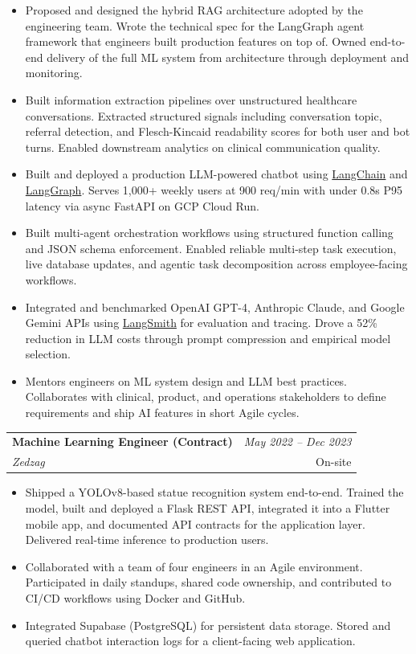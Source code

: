 \documentclass[a4paper,11pt]{article}
\makeatletter
\newcommand{\resumeSubheading}[4]{
\vspace{0.5mm}\item
    \begin{tabular*}{0.98\textwidth}[t]{l@{\extracolsep{\fill}}r}
        \textbf{#1} & \textit{\footnotesize{#4}} \\
        \textit{\footnotesize{#3}} &  \footnotesize{#2}\\
    \end{tabular*}
    \vspace{-2.4mm}
}
\newcommand{\resumeItemListStart}{\begin{justify}\begin{itemize}[leftmargin=3ex, rightmargin=2ex, noitemsep,labelsep=1.2mm,itemsep=0mm]\small}
\newcommand{\resumeItemListEnd}{\end{itemize}\end{justify}\vspace{-2mm}}
\makeatother
\begin{document}
\resumeItemListStart
\item Proposed and designed the hybrid RAG architecture adopted by the engineering team. Wrote the technical spec for the LangGraph agent framework that engineers built production features on top of. Owned end-to-end delivery of the full ML system from architecture through deployment and monitoring.
\item Built information extraction pipelines over unstructured healthcare conversations. Extracted structured signals including conversation topic, referral detection, and Flesch-Kincaid readability scores for both user and bot turns. Enabled downstream analytics on clinical communication quality.
\item Built and deployed a production LLM-powered chatbot using \href{https://www.langchain.com/}{LangChain} and \href{https://langchain-ai.github.io/langgraph/}{LangGraph}. Serves 1,000+ weekly users at 900 req/min with under 0.8s P95 latency via async FastAPI on GCP Cloud Run.
\item Built multi-agent orchestration workflows using structured function calling and JSON schema enforcement. Enabled reliable multi-step task execution, live database updates, and agentic task decomposition across employee-facing workflows.
\item Integrated and benchmarked OpenAI GPT-4, Anthropic Claude, and Google Gemini APIs using \href{https://www.langchain.com/langsmith}{LangSmith} for evaluation and tracing. Drove a 52\% reduction in LLM costs through prompt compression and empirical model selection.
\item Mentors engineers on ML system design and LLM best practices. Collaborates with clinical, product, and operations stakeholders to define requirements and ship AI features in short Agile cycles.
\resumeItemListEnd

\resumeSubheading
{Machine Learning Engineer (Contract)}{On-site}{Zedzag}{May 2022 -- Dec 2023}

\resumeItemListStart
\item Shipped a YOLOv8-based statue recognition system end-to-end. Trained the model, built and deployed a Flask REST API, integrated it into a Flutter mobile app, and documented API contracts for the application layer. Delivered real-time inference to production users.
\item Collaborated with a team of four engineers in an Agile environment. Participated in daily standups, shared code ownership, and contributed to CI/CD workflows using Docker and GitHub.
\item Integrated Supabase (PostgreSQL) for persistent data storage. Stored and queried chatbot interaction logs for a client-facing web application.
\resumeItemListEnd
\end{document}
